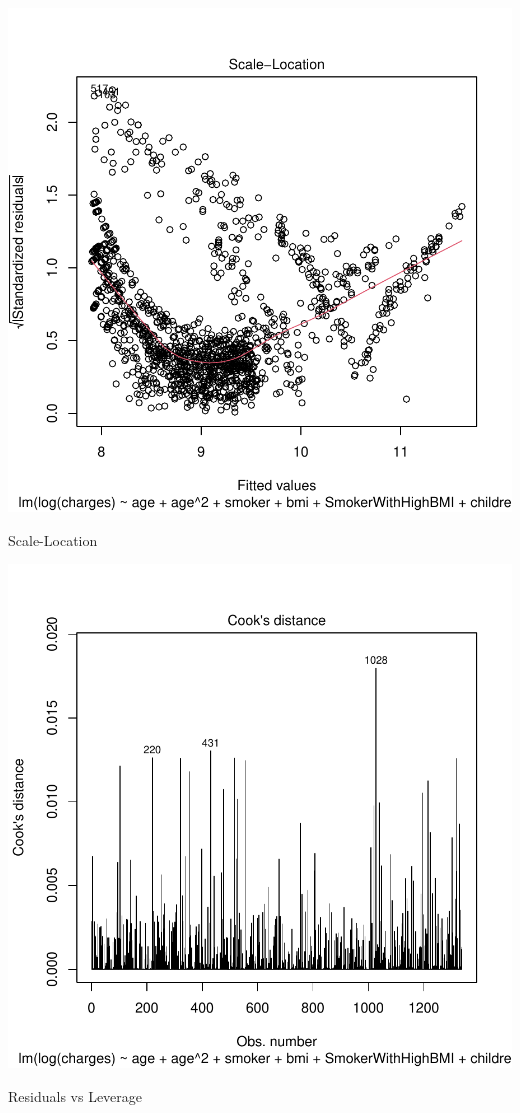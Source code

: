 \documentclass{article}
\begin{document}
\begin{centerfig}
\includegraphics{Untitled-067}
\caption{Scale-Location}
\end{centerfig}


\begin{centerfig}
\includegraphics{Untitled-068}
\caption{Residuals vs Leverage}
\end{centerfig}
\end{document}
